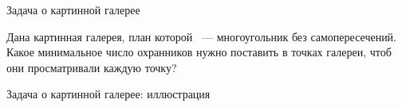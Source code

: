     \begin{frame}{Задача о картинной галерее}

        \begin{task}

            Дана картинная галерея, план которой ~--- многоугольник без самопересечений. Какое минимальное число охранников нужно поставить в точках галереи, чтоб
            они просматривали каждую точку?

        \end{task}

    \end{frame}

    \begin{frame}{Задача о картинной галерее: иллюстрация}

        \begin{center}
\end{center}
\end{frame}
